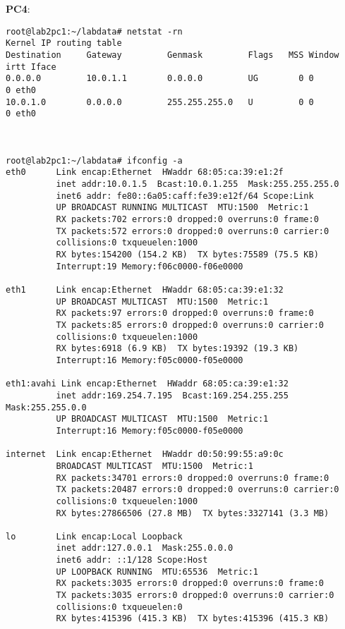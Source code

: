 \textbf{PC4}:
\begin{lstlisting}
root@lab2pc1:~/labdata# netstat -rn
Kernel IP routing table
Destination     Gateway         Genmask         Flags   MSS Window  irtt Iface
0.0.0.0         10.0.1.1        0.0.0.0         UG        0 0          0 eth0
10.0.1.0        0.0.0.0         255.255.255.0   U         0 0          0 eth0



root@lab2pc1:~/labdata# ifconfig -a
eth0      Link encap:Ethernet  HWaddr 68:05:ca:39:e1:2f  
          inet addr:10.0.1.5  Bcast:10.0.1.255  Mask:255.255.255.0
          inet6 addr: fe80::6a05:caff:fe39:e12f/64 Scope:Link
          UP BROADCAST RUNNING MULTICAST  MTU:1500  Metric:1
          RX packets:702 errors:0 dropped:0 overruns:0 frame:0
          TX packets:572 errors:0 dropped:0 overruns:0 carrier:0
          collisions:0 txqueuelen:1000 
          RX bytes:154200 (154.2 KB)  TX bytes:75589 (75.5 KB)
          Interrupt:19 Memory:f06c0000-f06e0000 

eth1      Link encap:Ethernet  HWaddr 68:05:ca:39:e1:32  
          UP BROADCAST MULTICAST  MTU:1500  Metric:1
          RX packets:97 errors:0 dropped:0 overruns:0 frame:0
          TX packets:85 errors:0 dropped:0 overruns:0 carrier:0
          collisions:0 txqueuelen:1000 
          RX bytes:6918 (6.9 KB)  TX bytes:19392 (19.3 KB)
          Interrupt:16 Memory:f05c0000-f05e0000 

eth1:avahi Link encap:Ethernet  HWaddr 68:05:ca:39:e1:32  
          inet addr:169.254.7.195  Bcast:169.254.255.255  Mask:255.255.0.0
          UP BROADCAST MULTICAST  MTU:1500  Metric:1
          Interrupt:16 Memory:f05c0000-f05e0000 

internet  Link encap:Ethernet  HWaddr d0:50:99:55:a9:0c  
          BROADCAST MULTICAST  MTU:1500  Metric:1
          RX packets:34701 errors:0 dropped:0 overruns:0 frame:0
          TX packets:20487 errors:0 dropped:0 overruns:0 carrier:0
          collisions:0 txqueuelen:1000 
          RX bytes:27866506 (27.8 MB)  TX bytes:3327141 (3.3 MB)

lo        Link encap:Local Loopback  
          inet addr:127.0.0.1  Mask:255.0.0.0
          inet6 addr: ::1/128 Scope:Host
          UP LOOPBACK RUNNING  MTU:65536  Metric:1
          RX packets:3035 errors:0 dropped:0 overruns:0 frame:0
          TX packets:3035 errors:0 dropped:0 overruns:0 carrier:0
          collisions:0 txqueuelen:0 
          RX bytes:415396 (415.3 KB)  TX bytes:415396 (415.3 KB)
\end{lstlisting}


